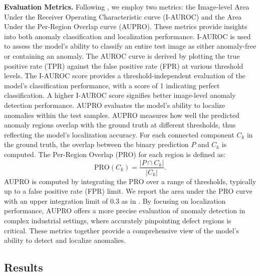\noindent \textbf{Evaluation Metrics.} Following \cite{bergmann2022mvtec, wang2023multimodal}, we employ two metrics: the Image-level Area Under the Receiver Operating Characteristic curve (I-AUROC) and the Area Under the Per-Region Overlap curve (AUPRO). These metrics provide insights into both anomaly classification and localization performance. I-AUROC is used to assess the model's ability to classify an entire test image as either anomaly-free or containing an anomaly. The AUROC curve is derived by plotting the true positive rate (TPR) against the false positive rate (FPR) at various threshold levels. The I-AUROC score provides a threshold-independent evaluation of the model's classification performance, with a score of 1 indicating perfect classification. A higher I-AUROC score signifies better image-level anomaly detection performance. AUPRO evaluates the model's ability to localize anomalies within the test samples. AUPRO measures how well the predicted anomaly regions overlap with the ground truth at different thresholds, thus reflecting the model's localization accuracy. For each connected component \( C_k \) in the ground truth, the overlap between the binary prediction \( P \) and \( C_k \) is computed. The Per-Region Overlap (PRO) for each region is defined as:
\begin{equation}
    \text{PRO}(C_k) = \frac{|P \cap C_k|}{|C_k|}.
\end{equation}
AUPRO is computed by integrating the PRO over a range of thresholds, typically up to a false positive rate (FPR) limit.  We report the area under the PRO curve with an upper integration limit of 0.3 as in \cite{bergmann2022mvtec}. By focusing on localization performance, AUPRO offers a more precise evaluation of anomaly detection in complex industrial settings, where accurately pinpointing defect regions is critical. These metrics together provide a comprehensive view of the model's ability to detect and localize anomalies.

\subsection*{Results}

